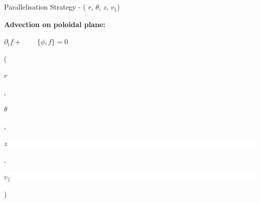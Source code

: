 \documentclass{beamer}
\begin{document}
\begin{frame}{Parallelisation Strategy - ( $r$, $\theta$, $z$, $v_\parallel$)}
\begin{minipage}[t]{.5\textwidth}
 \bf Advection on poloidal plane:
 \end{minipage}
 \hspace{.05\textwidth}
 \begin{minipage}[t]{.35\textwidth}
 $\partial_t f + \,\,\,\,\,\,\,\,\,\,\,\,\, \{\phi, f\} = 0$
\end{minipage}
(\colorbox{contigColor}{\strut $r$},\colorbox{contigColor}{\strut $\theta$},\colorbox{white}{\strut $z$},\colorbox{white}{\strut $v_\parallel$})
%
\vspace{.5em}



\end{frame}
\end{document}

